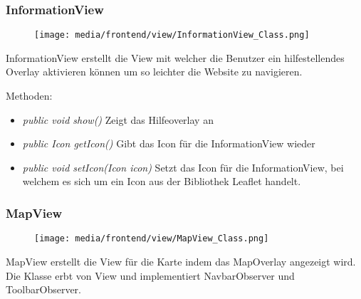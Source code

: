 \subsubsection{InformationView}
\begin{minipage}{0.3\textwidth}
    \begin{figure}[H]
        \texttt{[image: media/frontend/view/InformationView\_Class.png]}
    \end{figure}
    \end{minipage} \hfill
    \begin{minipage}{0.6\textwidth}
InformationView erstellt die View mit welcher die Benutzer ein hilfestellendes Overlay aktivieren können um so leichter 
die Website zu navigieren.
\end{minipage}

Methoden:
\begin{itemize} 
    \item \emph{public void show()} Zeigt das Hilfeoverlay an
    \item \emph{public Icon getIcon()} Gibt das Icon für die InformationView wieder
    \item \emph{public void setIcon(Icon icon)} Setzt das Icon für die InformationView, bei welchem es sich um ein Icon aus der Bibliothek \gls{Leaflet} handelt.
\end{itemize}

\subsubsection{MapView}
\begin{minipage}{0.3\textwidth}
    \begin{figure}[H]
        \texttt{[image: media/frontend/view/MapView\_Class.png]}
    \end{figure}
    \end{minipage} \hfill
    \begin{minipage}{0.6\textwidth}
MapView erstellt die View für die Karte indem das MapOverlay angezeigt wird. Die Klasse erbt von View und implementiert NavbarObserver und ToolbarObserver.
\end{minipage}

